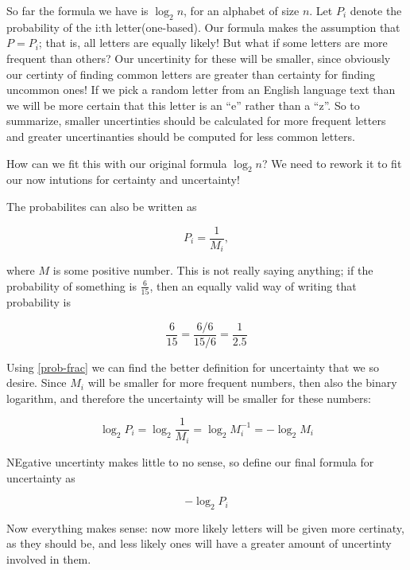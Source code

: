 So far the formula we have is $\log_2 n$, for an alphabet of size
$n$. Let $P_i$ denote the probability of the i:th
letter(one-based). Our formula makes the assumption that $P = P_i$;
that is, all letters are equally likely! But what if some letters are
more frequent than others? Our uncertinity for these will be smaller,
since obviously our certinty of finding common letters are greater
than certainty for finding uncommon ones! If we pick a random letter
from an English language text than we will be more certain that this
letter is an ``e'' rather than a ``z''. So to summarize, smaller
uncertinties should be calculated for more frequent letters and
greater uncertinanties should be computed for less common letters.

How can we fit this with our original formula $\log_2 n$? We need to
rework it to fit our now intutions for certainty and uncertainty!

The probabilites can also be written as

\begin{equation}
  \label{prob-frac}
  P_i = \frac{1}{M_i},
\end{equation}

where $M$ is some positive number. This is not really saying anything;
if the probability of something is $\frac{6}{15}$, then an equally
valid way of writing that probability is

\begin{equation*}
  \frac{6}{15} = \frac{6 / 6}{15 / 6} = \frac{1}{2.5}
\end{equation*}

Using \eqref{prob-frac} we can find the better definition for
uncertainty that we so desire. Since $M_i$ will be smaller for more
frequent numbers, then also the binary logarithm, and therefore the
uncertainty will be smaller for these numbers:

\begin{equation*}
  \log_2 P_i = \log_2 \frac{1}{M_i} = \log_2 M_i^{-1} = -\log_2 M_i
\end{equation*}

NEgative uncertinty makes little to no sense, so define our final
formula for uncertainty as

\begin{equation*}
  -\log_2 P_i
\end{equation*}

Now everything makes sense: now more likely letters will be given more
certinaty, as they should be, and less likely ones will have a greater
amount of uncertinty involved in them.

